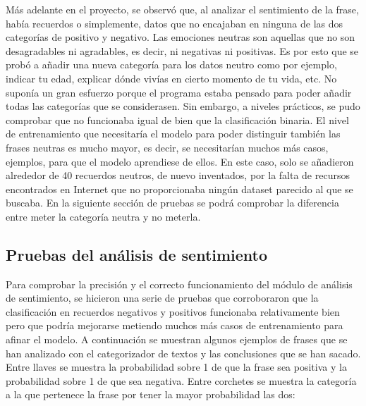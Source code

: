 Más adelante en el proyecto, se observó que, al analizar el sentimiento de la frase, había recuerdos o simplemente, datos que no encajaban en ninguna de las dos categorías de positivo y negativo. Las emociones neutras son aquellas que no son desagradables ni agradables, es decir, ni negativas ni positivas. Es por esto que se probó a añadir una nueva categoría para los datos neutro como por ejemplo, indicar tu edad, explicar dónde vivías en cierto momento de tu vida, etc. No suponía un gran esfuerzo porque el programa estaba pensado para poder añadir todas las categorías que se considerasen. Sin embargo, a niveles prácticos, se pudo comprobar que no funcionaba igual de bien que la clasificación binaria. El nivel de entrenamiento que necesitaría el modelo para poder distinguir también las frases neutras es mucho mayor, es decir, se necesitarían muchos más casos, ejemplos, para que el modelo aprendiese de ellos. En este caso, solo se añadieron alrededor de 40 recuerdos neutros, de nuevo inventados, por la falta de recursos encontrados en Internet que no proporcionaba ningún dataset parecido al que se buscaba. En la siguiente sección de pruebas se podrá comprobar la diferencia entre meter la categoría neutra y no meterla. 

\subsection{Pruebas del análisis de sentimiento}

Para comprobar la precisión y el correcto funcionamiento del módulo de análisis de sentimiento, se hicieron una serie de pruebas que corroboraron que la clasificación en recuerdos negativos y positivos funcionaba relativamente bien pero que podría mejorarse metiendo muchos más casos de entrenamiento para afinar el modelo. A continuación se muestran algunos ejemplos de frases que se han analizado con el categorizador de textos y las conclusiones que se han sacado. Entre llaves se muestra la probabilidad sobre 1 de que la frase sea positiva y la probabilidad sobre 1 de que sea negativa. Entre corchetes se muestra la categoría a la que pertenece la frase por tener la mayor probabilidad las dos:

